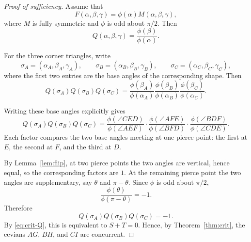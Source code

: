 \documentclass[12pt,a4paper]{amsart}
\theoremstyle{remark}
\begin{document}
\begin{proof}[Proof of sufficiency]
Assume that
\[
F(\alpha,\beta,\gamma)=\phi(\alpha)M(\alpha,\beta,\gamma),
\]
where \(M\) is fully symmetric and \(\phi\) is odd about \(\pi/2\).  Then
\[
Q(\alpha,\beta,\gamma)=\frac{\phi(\beta)}{\phi(\alpha)}.
\]

For the three corner triangles, write
\[
\sigma_A=(\alpha_A,\beta_A,\gamma_A),\qquad
\sigma_B=(\alpha_B,\beta_B,\gamma_B),\qquad
\sigma_C=(\alpha_C,\beta_C,\gamma_C),
\]
where the first two entries are the base angles of the corresponding shape.
Then
\[
Q(\sigma_A)Q(\sigma_B)Q(\sigma_C)
=
\frac{\phi(\beta_A)}{\phi(\alpha_A)}
\frac{\phi(\beta_B)}{\phi(\alpha_B)}
\frac{\phi(\beta_C)}{\phi(\alpha_C)}.
\]

Writing these base angles explicitly gives
\[
Q(\sigma_A)Q(\sigma_B)Q(\sigma_C)
=
\frac{\phi(\angle CED)}{\phi(\angle AEF)}
\cdot
\frac{\phi(\angle AFE)}{\phi(\angle BFD)}
\cdot
\frac{\phi(\angle BDF)}{\phi(\angle CDE)}.
\]
Each factor compares the two base angles meeting at one pierce point: the first
at \(E\), the second at \(F\), and the third at \(D\).

By Lemma~\ref{lem:flip}, at two pierce points the two angles are vertical, hence equal, so
the corresponding factors are \(1\).  At the remaining pierce point the two
angles are supplementary, say \(\theta\) and \(\pi-\theta\).  Since \(\phi\) is
odd about \(\pi/2\),
\[
\frac{\phi(\theta)}{\phi(\pi-\theta)}=-1.
\]
Therefore
\[
Q(\sigma_A)Q(\sigma_B)Q(\sigma_C)=-1.
\]
By \eqref{eq:crit-Q}, this is equivalent to \(S+T=0\).  Hence, by
Theorem~\ref{thm:crit}, the cevians \(AG\), \(BH\), and \(CI\) are concurrent.
\end{proof}
\end{document}
